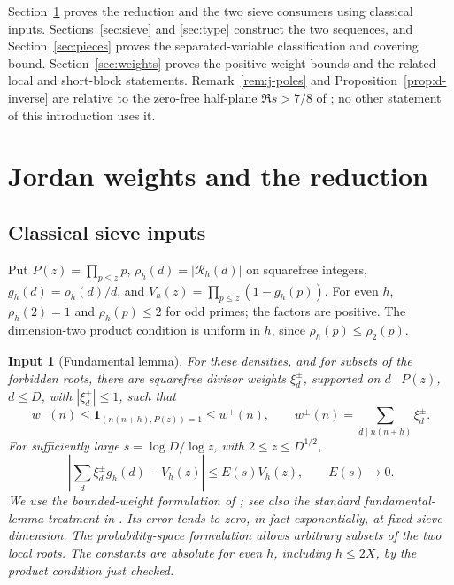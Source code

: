 \documentclass[11pt]{article}
\newtheorem{inputthm}[theorem]{Input}
\theoremstyle{definition}
\newcommand{\ind}{\mathbf 1}
\theoremstyle{remark}
\numberwithin{equation}{section}
\begin{document}
Section~\ref{sec:reduction} proves the reduction and the two sieve consumers using classical inputs.
Sections~\ref{sec:sieve} and \ref{sec:type} construct the two sequences, and Section~\ref{sec:pieces}
proves the separated-variable classification and covering bound. Section~\ref{sec:weights} proves the
positive-weight bounds and the related local and short-block statements.
Remark~\ref{rem:j-poles} and Proposition~\ref{prop:d-inverse} are relative to the zero-free half-plane
$\Re s>7/8$ of \cite{OpenAI003}; no other statement of this introduction uses it.

\section{Jordan weights and the reduction}\label{sec:reduction}
\subsection{Classical sieve inputs}
Put $P(z)=\prod_{p\le z}p$, $\rho_h(d)=|\mathcal R_h(d)|$ on squarefree integers,
$g_h(d)=\rho_h(d)/d$, and $V_h(z)=\prod_{p\le z}(1-g_h(p))$.
For even $h$, $\rho_h(2)=1$ and $\rho_h(p)\le2$ for odd primes; the factors are positive.
The dimension-two product condition is uniform in $h$, since $\rho_h(p)\le\rho_2(p)$.
\begin{inputthm}[Fundamental lemma]\label{input:fundamental}
For these densities, and for subsets of the forbidden roots, there are squarefree divisor weights
$\xi_d^\pm$, supported on $d\mid P(z)$, $d\le D$, with $|\xi_d^\pm|\le1$, such that
\begin{equation}\label{eq:fl-weights}
 w^-(n)\le\ind_{(n(n+h),P(z))=1}\le w^+(n),\qquad
 w^\pm(n)=\sum_{d\mid n(n+h)}\xi_d^\pm.
\end{equation}
For sufficiently large $s=\log D/\log z$, with $2\le z\le D^{1/2}$,
\begin{equation}\label{eq:fl-main}
 \left|\sum_d\xi_d^\pm g_h(d)-V_h(z)\right|\le E(s)V_h(z),\qquad E(s)\to0.
\end{equation}
We use the bounded-weight formulation of \cite[Theorem~3.6(a), p.~38]{Ford}; see also the standard
fundamental-lemma treatment in \cite{Opera}. Its error tends to zero, in fact exponentially, at fixed
sieve dimension. The probability-space formulation allows arbitrary subsets of the two local roots.
The constants are absolute for even $h$, including $h\le2X$, by the product condition just checked.
\end{inputthm}
\end{document}
